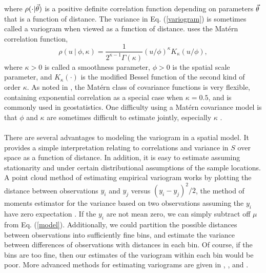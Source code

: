 \documentclass{uwstat572}
\begin{document}
where $\rho(\cdot  \vert \vec{\theta})$ is a positive definite correlation function depending on parameters $\vec{\theta}$ that is a function of distance.  The variance in Eq. (\ref{variogram}) is sometimes called a variogram when viewed as a function of distance.  \citet{diggle2010} uses the Mat\'{e}rn correlation function,
$$ \rho(u \ \vert \ \phi, \kappa) = \frac{1}{2^{\kappa - 1} \Gamma(\kappa)} (u/\phi)^{\kappa} K_\kappa(u/\phi), $$
where $\kappa > 0$ is called a smoothness parameter, $\phi > 0$ is the spatial scale parameter, and $K_\kappa(\cdot)$ is the modified Bessel function of the second kind of order $\kappa$.  As noted in \citet{diggle2010}, the Mat\'{e}rn class of covariance functions is very flexible, containing exponential correlation as a special case when $\kappa = 0.5$, and is commonly used in geostatistics.  One difficulty using a Mat\'{e}rn covariance model is that $\phi$ and $\kappa$ are sometimes difficult to estimate jointly, especially $\kappa$ \citep{diggle2010}.
\\\\
There are several advantages to modeling the variogram in a spatial model.  It provides a simple interpretation relating to correlations and variance in $S$ over space as a function of distance.  In addition, it is easy to estimate assuming stationarity and under certain distributional assumptions of the sample locations.  A point cloud method of estimating empirical variogram works by plotting the distance between observations $y_i$ and $y_j$ versus $(y_i - y_j)^2/2$, the method of moments estimator for the variance based on two observations assuming the $y_i$ have zero expectation \citep{diggle2010}.  If the $y_i$ are not mean zero, we can simply subtract off $\mu$ from Eq. (\ref{model}).  Additionally, we could partition the possible distances between observations into sufficiently fine bins, and estimate the variance between differences of observations with distances in each bin.  Of course, if the bins are too fine, then our estimates of the variogram within each bin would be poor.  More advanced methods for estimating variograms are given in \citet[section 2.2]{chiles1999}, \citet{cressie1985}, and \citet[section 2.4]{cressie1991}.
\\\\
\end{document}
